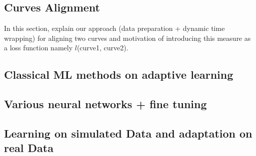 \subsection{Curves Alignment}
In this section, explain our approach (data preparation + dynamic time wrapping) for aligning two curves and motivation of introducing this measure as a loss function namely $l$(curve1, curve2). 
\subsection{Classical ML methods on adaptive learning}
\subsection{Various neural networks + fine tuning}
\subsection{Learning on simulated Data and adaptation on real Data}